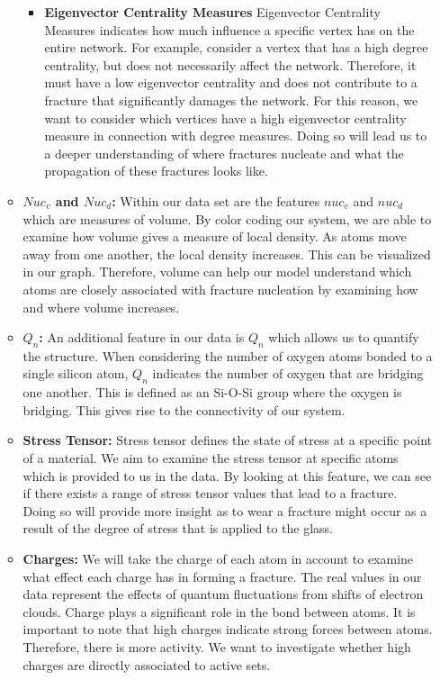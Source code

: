 \begin{itemize}
\begin{itemize}
    \begin{itemize}
        \item \textbf{Eigenvector Centrality Measures } Eigenvector Centrality Measures indicates how much influence a specific vertex has on the entire network. For example, consider a vertex that has a high degree centrality, but does not necessarily affect the network. Therefore, it must have a low eigenvector centrality and does not contribute to a fracture that significantly damages the network. For this reason, we want to consider which vertices have a high eigenvector centrality measure in connection with degree measures. Doing so will lead us to a deeper understanding of where fractures nucleate and what the propagation of  these fractures looks like.
    \end{itemize}
\item \textbf{$Nuc_v$ and $Nuc_d$:} Within our data set are the features $nuc_v$ and $nuc_d$ which are measures of volume. By color coding our system, we are able to examine how volume gives a measure of local density. As atoms move away from one another, the local density increases. This can be visualized in our graph. Therefore, volume can help our model understand which atoms are closely associated with fracture nucleation by examining how and where volume increases.

\item\textbf{$Q_n$:} An additional feature in our data is $Q_n$ which allows us to quantify the structure. When considering the number of oxygen atoms bonded to a single silicon atom, $Q_n$ indicates the number of oxygen that are bridging one another. This is defined as an Si-O-Si group where the oxygen is bridging. This gives rise to the connectivity of our system.

\item\textbf{Stress Tensor:} Stress tensor defines the state of stress at a specific point of a material. We aim to examine the stress tensor at specific atoms which is provided to us in the data. By looking at this feature, we can see if there exists a range of stress tensor values that lead to a fracture. Doing so will provide more insight as to wear a fracture might occur as a result of the degree of stress that is applied to the glass.

\item\textbf{Charges:} We will take the charge of each atom in account to examine what effect each charge has in forming a fracture. The real values in our data represent the effects of quantum fluctuations from shifts of electron clouds. Charge plays a significant role in the bond between atoms. It is important to note that high charges indicate strong forces between atoms. Therefore, there is more activity. We want to investigate whether high charges are directly associated to active sets. 
\end{itemize}


\end{itemize}
